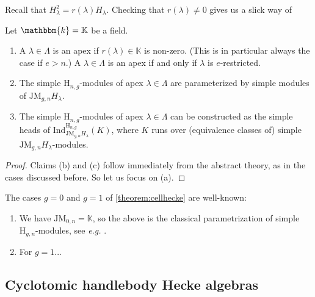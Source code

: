\documentclass[a4paper,11pt]{amsart}
\newcommand{\eg}{\textsl{e.g.}}
\newcommand{\setstuff}[1]{\mathrm{#1}}
\newcommand{\K}{\mathbb{K}}
\newcommand{\KK}{\mathbbm{k}}
\numberwithin{equation}{section}
\let\fullref\autoref
\begin{document}
Recall that $H_{\lambda}^{2}=r(\lambda)H_{\lambda}$.
Checking that $r(\lambda)\neq 0$ gives us a slick 
way of 

\begin{theorem}\label{theorem:cellhecke}
Let $\KK=\K$ be a field.
\begin{enumerate}

\item A $\lambda\in\Lambda$ is an apex 
if $r(\lambda)\in\K$ is non-zero. (This is in particular 
always the case if $e>n$.) 
A $\lambda\in\Lambda$ is an apex 
if and only if $\lambda$ is $e$-restricted.

\item The simple $\setstuff{H}_{n,g}$-modules of 
apex $\lambda\in\Lambda$ 
are parameterized by simple modules of $\setstuff{JM}_{g,n}H_{\lambda}$.

\item The simple $\setstuff{H}_{n,g}$-modules of 
apex $\lambda\in\Lambda$ can be constructed as 
the simple heads of
$\mathrm{Ind}_{\setstuff{JM}_{g,n}H_{\lambda}}^{\setstuff{H}_{n,g}}(K)$, 
where $K$ runs over (equivalence classes of) 
simple $\setstuff{JM}_{g,n}H_{\lambda}$-modules.

\end{enumerate}
\end{theorem}

\begin{proof}
Claims (b) and (c) follow immediately from the abstract theory, as 
in the cases discussed before. So let us focus on (a).
\end{proof}

\begin{example}
The cases $g=0$ and $g=1$ of \fullref{theorem:cellhecke}
are well-known:
\begin{enumerate}

\item We have $\setstuff{JM}_{0,n}=\K$, so the above 
is the classical parametrization 
of simple $\setstuff{H}_{g,n}$-modules, see {\eg} 
\cite[Section 3.4]{Ma-hecke-schur}.

\item For $g=1$...

\end{enumerate}
\end{example}

\subsection{Cyclotomic handlebody Hecke algebras}\label{subsection:ak-hecke}
\end{document}
